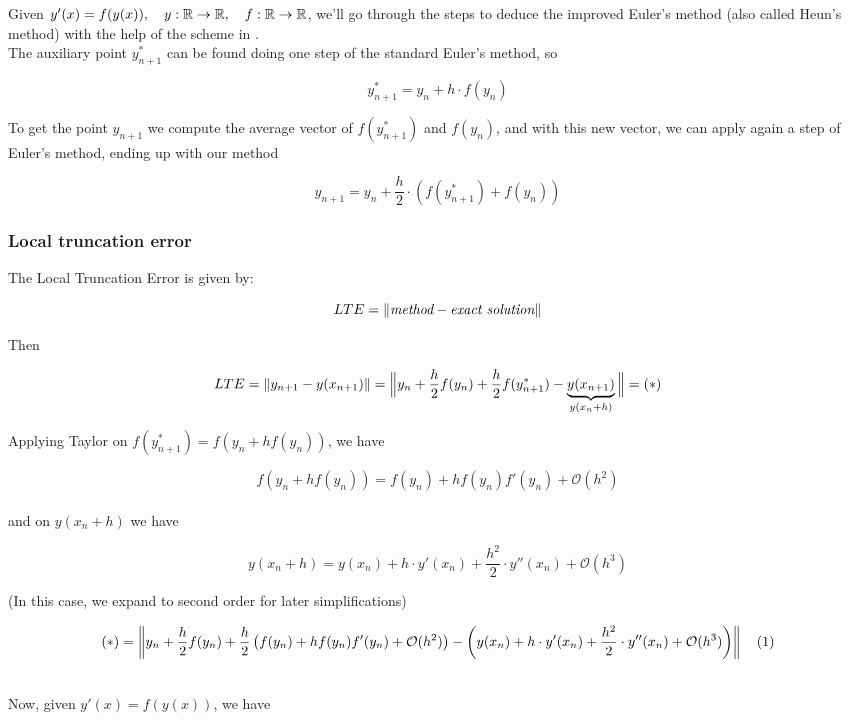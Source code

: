 Given $y'(x) = f(y(x)), \quad y: \mathbb{R} \to \mathbb{R}, \quad f:\mathbb{R} \to \mathbb{R}$, we'll go through the steps to deduce the improved Euler's method (also called Heun's method) with the help of the scheme in . \\

The auxiliary point $y_{n+1}^*$ can be found doing one step of the standard Euler's method, so 

\[
  y_{n+1}^* = y_n + h\cdot f(y_n)
\]
\vspace{0.01cm}

To get the point $y_{n+1}$ we compute the average vector of $f(y_{n+1}^*)$ and $f(y_n)$, and with this new vector, we can apply again a step of Euler's method, ending up with our method

\[
  \boxed{y_{n+1} = y_n + \frac{h}{2}\cdot \left(f(y_{n+1}^*) + f(y_n)\right)}
\]
\newpage

\subsubsection{Local truncation error}

The Local Truncation Error is given by:

\[
  LTE = \left\lVert\textit{method} - \textit{exact solution}\right\rVert
\]

Then

\[
  LTE = \left\lVert y_{n+1} - y(x_{n+1})\right\rVert = \Big\rVert y_n + \frac{h}{2}f(y_n) + \frac{h}{2}f(y_{n+1}^*) - \underbrace{y(x_{n+1})}_{y(x_n + h)}\Big\rVert = (*)
\]

Applying Taylor on $f(y_{n+1}^*) = f\left(y_n + hf(y_n)\right)$, we have

\[
  f\left(y_n + hf(y_n)\right) = f(y_n) + hf(y_n)f'(y_n) + \mathcal{O}(h^2)
\]
\\
and on $y(x_n +h)$ we have

\[
  y(x_n + h) = y(x_n) + h\cdot y'(x_n) + \frac{h^2}{2}\cdot y''(x_n) + \mathcal{O}(h^3)
\]

(In this case, we expand to second order for later simplifications)

\footnotesize

\[
    (*) = \left\lVert y_n + \frac{h}{2}f(y_n) + \frac{h}{2}\left(f(y_n) + hf(y_n)f'(y_n) + \mathcal{O}(h^2) \right) - \left(y(x_n) + h\cdot y'(x_n) + \frac{h^2}{2}\cdot y''(x_n) + \mathcal{O}(h^3) \right)\right\rVert \quad (1)
\]

\normalsize
\-\\
Now, given $y'(x) = f(y(x))$, we have

